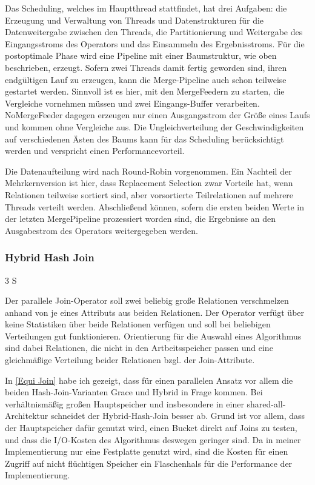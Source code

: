 \documentclass[a4paper,12pt,twoside]{article}
\begin{document}
Das Scheduling, welches im Hauptthread stattfindet, hat drei Aufgaben: die Erzeugung und Verwaltung von Threads und Datenstrukturen für die Datenweitergabe zwischen den Threads, die Partitionierung und Weitergabe des Eingangsstroms des Operators und das Einsammeln des Ergebnisstroms. Für die postoptimale Phase wird eine Pipeline mit einer Baumstruktur, wie oben beschrieben, erzeugt. Sofern zwei Threads damit fertig geworden sind, ihren endgültigen Lauf zu erzeugen, kann die Merge-Pipeline auch schon teilweise gestartet werden. Sinnvoll ist es hier, mit den MergeFeedern zu starten, die Vergleiche vornehmen müssen und zwei Eingangs-Buffer verarbeiten. NoMergeFeeder dagegen erzeugen nur einen Ausgangsstrom der Größe eines Laufs und kommen ohne Vergleiche aus. Die Ungleichverteilung der Geschwindigkeiten auf verschiedenen Ästen des Baums kann für das Scheduling berücksichtigt werden und verspricht einen Performancevorteil.

Die Datenaufteilung wird nach Round-Robin vorgenommen. Ein Nachteil der Mehrkernversion ist hier, dass Replacement Selection zwar Vorteile hat, wenn Relationen teilweise sortiert sind, aber vorsortierte Teilrelationen auf mehrere Threads verteilt werden. Abschließend können, sofern die ersten beiden Werte in der letzten MergePipeline prozessiert worden sind, die Ergebnisse an den Ausgabestrom des Operators weitergegeben werden.

\subsubsection{Hybrid Hash Join} 3 S

Der parallele Join-Operator soll zwei beliebig große Relationen verschmelzen anhand von je eines Attributs aus beiden Relationen. Der Operator verfügt über keine Statistiken über beide Relationen verfügen und soll bei beliebigen Verteilungen gut funktionieren. Orientierung für die Auswahl eines Algorithmus sind dabei Relationen, die nicht in den Artbeitsspeicher passen und eine gleichmäßige Verteilung beider Relationen bzgl. der Join-Attribute.

In \autoref{Equi Join} habe ich gezeigt, dass für einen parallelen Ansatz vor allem die beiden Hash-Join-Varianten Grace und Hybrid in Frage kommen. Bei verhältnismäßig großen Hauptspeicher und insbesondere in einer shared-all-Architektur schneidet der Hybrid-Hash-Join besser ab. Grund ist vor allem, dass der Hauptspeicher dafür genutzt wird, einen Bucket direkt auf Joins zu testen, und dass die I/O-Kosten des Algorithmus deswegen geringer sind. Da in meiner Implementierung nur eine Festplatte genutzt wird, sind die Kosten für einen Zugriff auf nicht flüchtigen Speicher ein Flaschenhals für die Performance der Implementierung.
\end{document}
